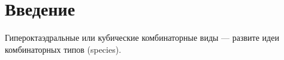 \section{Введение}
Гипероктаэдральные или кубические комбинаторные виды --- развите идеи комбинаторных типов (species).

